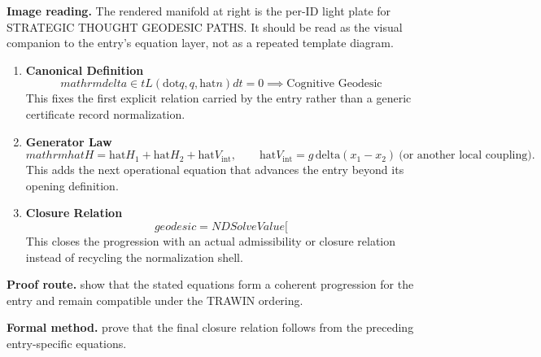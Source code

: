 \begin{samepage}
\noindent\begin{minipage}[t]{0.45\linewidth}
\vspace{0pt}
\raggedright
\scriptsize\textbf{Image reading.} The rendered manifold at right is the per-ID light plate for STRATEGIC THOUGHT GEODESIC PATHS. It should be read as the visual companion to the entry's equation layer, not as a repeated template diagram.\par
\end{minipage}\hfill
\begin{minipage}[t]{0.53\linewidth}
\vspace*{-0.10in}
\raggedright
{}
\end{minipage}
\end{samepage}

\clearpage


\begin{enumerate}[leftmargin=1.6em,itemsep=9pt,topsep=6pt]
\item \textbf{Canonical Definition}
\[
mathrm{delta} \in t L(\mathrm{dot}{q}, q, \mathrm{hat}{n}) dt = 0 \implies \text{Cognitive Geodesic}
\]
This fixes the first explicit relation carried by the entry rather than a generic certificate record normalization.

\item \textbf{Generator Law}
\[
mathrm{hat} H=\mathrm{hat} H_1+\mathrm{hat} H_2+ \mathrm{hat} V_{\text{int}},\qquad \mathrm{hat} V_{\text{int}} = g\,\mathrm{delta}(x_1-x_2)\ \text{(or another local coupling)}.
\]
This adds the next operational equation that advances the entry beyond its opening definition.

\item \textbf{Closure Relation}
\[
geodesic = NDSolveValue[
\]
This closes the progression with an actual admissibility or closure relation instead of recycling the normalization shell.
\end{enumerate}

\textbf{Proof route.} show that the stated equations form a coherent progression for the entry and remain compatible under the TRAWIN ordering.

\textbf{Formal method.} prove that the final closure relation follows from the preceding entry-specific equations.


